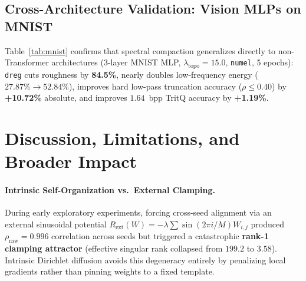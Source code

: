 \documentclass[11pt,a4paper]{article}
\begin{document}
\subsection{Cross-Architecture Validation: Vision MLPs on MNIST}
Table~\ref{tab:mnist} confirms that spectral compaction generalizes directly to non-Transformer architectures (3-layer MNIST MLP, $\lambda_{\text{topo}} = 15.0$, \texttt{numel}, 5 epochs): \texttt{dreg} cuts roughness by \textbf{84.5\%}, nearly doubles low-frequency energy ($27.87\% \to 52.84\%$), improves hard low-pass truncation accuracy ($\rho \le 0.40$) by \textbf{+10.72\%} absolute, and improves $1.64$~bpp TritQ accuracy by \textbf{+1.19\%}.

\begin{table}[t]
    \centering
    \small
    \caption{\textbf{Cross-Architecture Validation: 3-Layer Vision MLP on MNIST (5 epochs, \texttt{numel}, $\lambda=15.0$).}}
    \label{tab:mnist}
\end{table}

\section{Discussion, Limitations, and Broader Impact}
\label{sec:discussion}

\paragraph{Intrinsic Self-Organization vs.\ External Clamping.}
During early exploratory experiments, forcing cross-seed alignment via an external sinusoidal potential $R_{\text{ext}}(W) = -\lambda \sum \sin(2\pi i / M) W_{i,j}$ produced $\rho_{\text{raw}} = 0.996$ correlation across seeds but triggered a catastrophic \textbf{rank-1 clamping attractor} (effective singular rank collapsed from $199.2$ to $3.58$). Intrinsic Dirichlet diffusion avoids this degeneracy entirely by penalizing local gradients rather than pinning weights to a fixed template.
\end{document}
